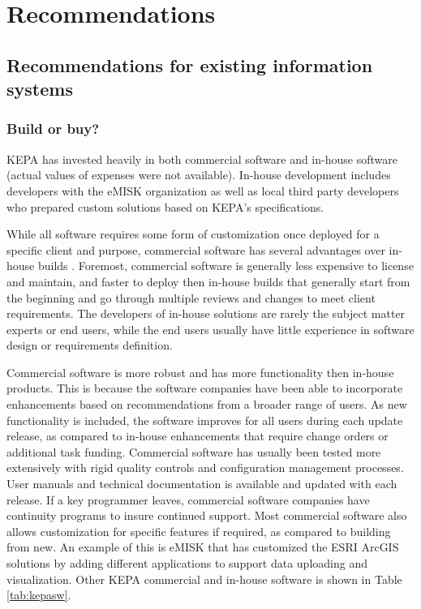\chapter{Recommendations}

\section{Recommendations for existing information systems}

\subsection{Build or buy?}
KEPA has invested heavily in both commercial software and in-house software (actual values of expenses were not available). In-house development includes developers with the eMISK organization as well as local third party developers who prepared custom solutions based on KEPA's specifications.

While all software requires some form of customization once deployed for a specific client and purpose, commercial software has several advantages over in-house builds \citep{Shahzad2017}. Foremost, commercial software is generally less expensive to license and maintain, and faster to deploy then in-house builds that generally start from the beginning and go through multiple reviews and changes to meet client requirements. The developers of in-house solutions are rarely the subject matter experts or end users, while the end users usually have little experience in software design or requirements definition.

Commercial software is more robust and has more functionality then in-house products. This is because the software companies have been able to incorporate enhancements based on recommendations from a broader range of users. As new functionality is included, the software improves for all users during each update release, as compared to in-house enhancements that require change orders or additional task funding. Commercial software has usually been tested more extensively with rigid quality controls and configuration management processes. User manuals and technical documentation is available and updated with each release. If a key programmer leaves, commercial software companies have continuity programs to insure continued support. Most commercial software also allows customization for specific features if required, as compared to building from new. An example of this is eMISK that has customized the ESRI ArcGIS solutions by adding different applications to support data uploading and visualization. Other KEPA commercial and in-house software is shown in Table \ref{tab:kepasw}. 

